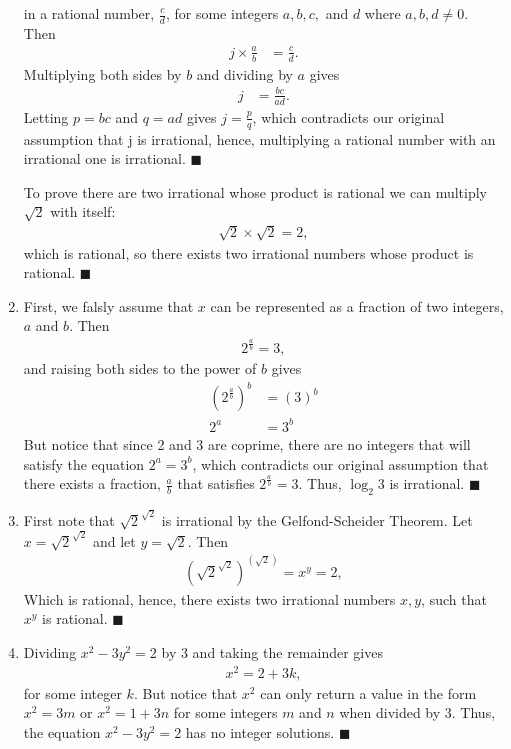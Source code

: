 \documentclass[12pt]{article}
\begin{document}
\begin{enumerate}
	      in a rational number, $\frac{c}{d}$, for some integers $a,b,c, $ and $d$
	      where $a,b,d \neq 0$. Then
	      \begin{align*}
		      j \times \frac{a}{b} & = \frac{c}{d}.
	      \end{align*}
	      Multiplying both sides by $b$ and dividing by $a$ gives
	      \begin{align*}
		      j & = \frac{bc}{ad}.
	      \end{align*}
	      Letting $p = bc$ and $q = ad$ gives $j = \frac{p}{q}$, which contradicts
	      our original assumption that j is irrational, hence, multiplying a rational
	      number with an irrational one is irrational. \hfill $\blacksquare$

	      To prove there are two irrational whose product is rational we can multiply
	      $\sqrt2$ with itself:
	      \begin{align*}
		      \sqrt2 \times \sqrt2 = 2,
	      \end{align*}
	      which is rational, so there exists two irrational numbers whose product
	      is rational. \hfill $\blacksquare$
	\item First, we falsly assume that $x$ can be represented as a fraction
	      of two integers, $a$ and $b$. Then
	      \begin{align*}
		      2^\frac{a}{b} = 3,
	      \end{align*}
	      and raising both sides to the power of $b$ gives
	      \begin{align*}
		      (2^\frac{a}{b})^b & = (3)^b \\
		      2^a               & = 3^b
	      \end{align*}
	      But notice that since 2 and 3 are coprime, there are no integers that
	      will satisfy the equation $2^a = 3^b$, which contradicts our original
	      assumption that there exists a fraction, $\frac{a}{b}$ that satisfies
	      $2^\frac{a}{b} = 3$. Thus, $\log_{2}3$ is irrational. \hfill $\blacksquare$
	\item First note that $\sqrt2^{\sqrt2}$ is irrational by the Gelfond-Scheider 
          Theorem. Let $x = \sqrt2^{\sqrt2}$ and let $y = \sqrt2$. Then
	      \begin{align*}
			  (\sqrt{2}^{\sqrt{2}})^{(\sqrt{2})} = x^y = 2,
	      \end{align*}
	      Which is rational, hence, there exists two irrational numbers $x,y$, such that
	      $x^y$ is rational. \hfill $\blacksquare$
	\item Dividing $x^2 -3y^2 = 2$ by 3 and taking the remainder gives
	      \begin{align*}
		      x^2 = 2 + 3k,
	      \end{align*}
	      for some integer $k$. But notice that $x^2$ can only return a value
	      in the form $x^2 = 3m$ or $x^2 = 1 + 3n$ for some integers $m$ and $n$
	      when divided by 3. Thus, the equation $x^2-3y^2 = 2$ has no integer
	      solutions. \hfill $\blacksquare$
\end{enumerate}
\end{document}
